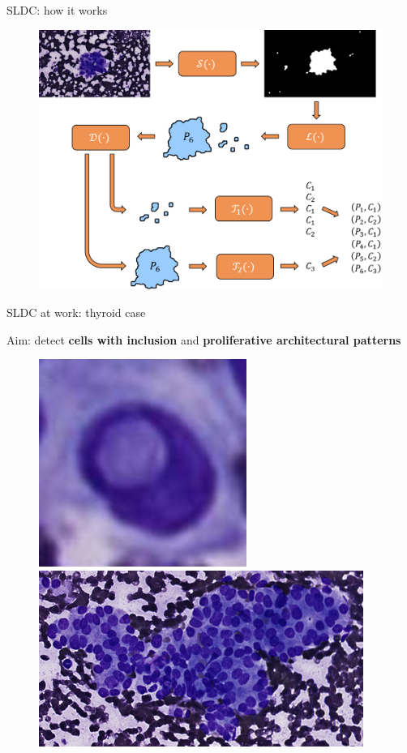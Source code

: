 \documentclass{beamer}
\begin{document}
\begin{frame}{SLDC: how it works}
	\begin{figure}
		\includegraphics[scale=0.45]{images/workflow_illustration.png}
	\end{figure}
\end{frame}


\begin{frame}{SLDC at work: thyroid case}
	\begin{center}	
		Aim: detect \textbf{cells with inclusion} and \textbf{proliferative architectural patterns}
	\end{center}
	\begin{figure}
		\includegraphics[scale=0.35]{images/incl1.png}
		\hspace{1cm}
		\includegraphics[scale=0.55]{images/prolif_pattern_1.png}
	\end{figure}
\end{frame}
\end{document}
